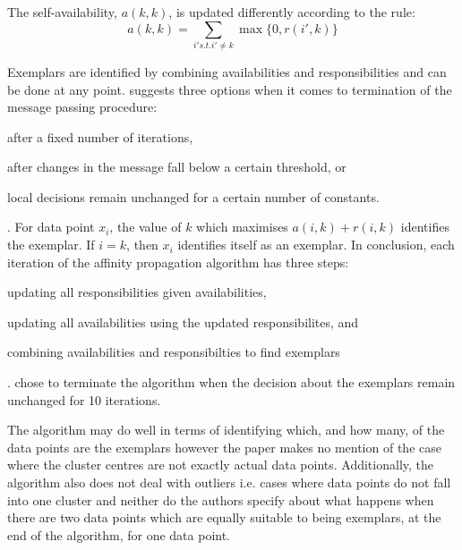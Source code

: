 \documentclass[a4paper]{article}
\begin{document}
The self-availability, $a(k,k)$, is updated differently according to the rule:
\begin{equation}\label{eq:avail2}
a(k,k) = \sum_{i' s.t. i' \ne k}\max\{0,r(i',k)\}
\end{equation}



Exemplars are identified by combining availabilities and responsibilities and can be done at any point. \citet{frey07} suggests three options when it comes to termination of the message passing procedure:
\begin{enumerate*}[label=\roman*)] \item after a fixed number of iterations, \item after changes in the message fall below a certain threshold, or \item local decisions remain unchanged for a certain number of constants. \end{enumerate*}. For data point $x_i$, the value of $k$ which maximises $a(i,k) + r(i,k)$ identifies the exemplar. If $i=k$, then $x_i$ identifies itself as an exemplar. In conclusion, each iteration of the affinity propagation algorithm has three steps: \begin{enumerate*}[label=\roman*)] \item updating all responsibilities given availabilities, \item updating all availabilities using the updated responsibilites, and \item combining availabilities and responsibilties to find exemplars \end{enumerate*}. \citet{frey07} chose to terminate the algorithm when the decision about the exemplars remain unchanged for 10 iterations.

The algorithm may do well in terms of identifying which, and how many, of the data points are the exemplars however the paper makes no mention of the case where the cluster centres are not exactly actual data points. Additionally, the algorithm also does not deal with outliers i.e. cases where data points do not fall into one cluster and neither do the authors specify about what happens when there are two data points which are equally suitable to being exemplars, at the end of the algorithm, for one data point.
\end{document}
